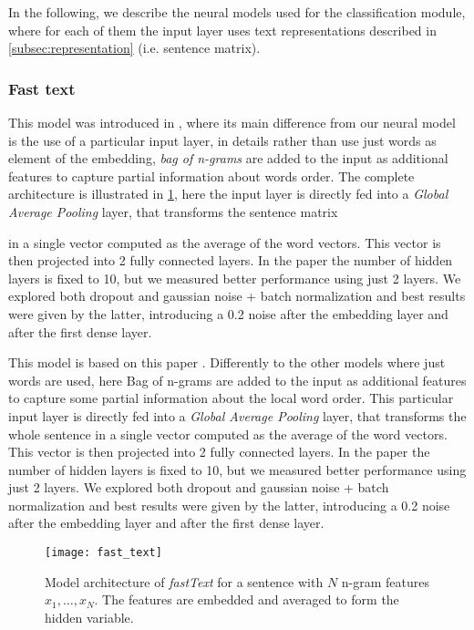 In the following, we describe the neural models used for the classification module, where for each of them the input layer uses text representations described in \cref{subsec:representation} (i.e. sentence matrix).


\subsubsection{Fast text}

This model was introduced in \cite{joulin2016bag}, where its main difference from our neural model is the use of a particular input layer, in details rather than use just words as element of the embedding, \emph{bag of n-grams} are added to the input as additional features to capture partial information about words order.
The complete architecture is illustrated in \cref{fig:fastText}, here the input layer is directly fed into a \emph{Global Average Pooling} layer, that transforms the sentence matrix 

in a single vector computed as the average of the word vectors.
This vector is then projected into 2 fully connected layers. In the paper the number of hidden layers is fixed to 10, but we measured better performance using just 2 layers.
We explored both dropout and gaussian noise + batch normalization and best results were given by the latter, introducing a 0.2 noise after the embedding layer and after the first dense layer.


This model is based on this paper \cite{joulin2016bag}.
Differently to the other models where just words are used, here Bag of n-grams are added to the input as additional features to capture some partial information about the local word order.
This particular input layer is directly fed into a \emph{Global Average Pooling} layer, that transforms the whole sentence in a single vector computed as the average of the word vectors.
This vector is then projected into 2 fully connected layers. In the paper the number of hidden layers is fixed to 10, but we measured better performance using just 2 layers.
We explored both dropout and gaussian noise + batch normalization and best results were given by the latter, introducing a 0.2 noise after the embedding layer and after the first dense layer.
\begin{figure}[h]
\footnotesize
\centering
\texttt{[image: fast\_text]}
\caption{\cite{joulin2016bag} Model architecture of \emph{fastText} for a sentence with $N$ n-gram features $x_1,\dots,x_N$. The features are embedded and averaged to form the hidden variable.}
\label{fig:fastText}
\end{figure}


